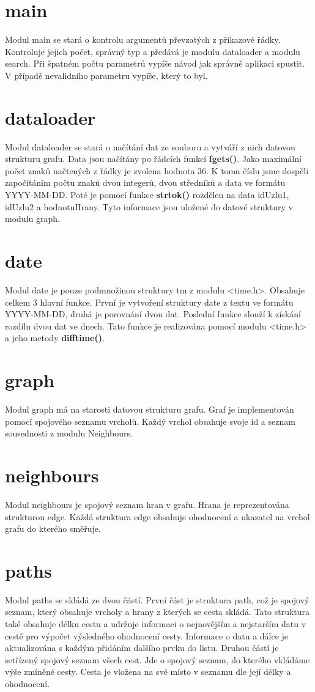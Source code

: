 \documentclass[
12pt,
a4paper,
pdftex,
czech,
titlepage
]{report}
\begin{document}
\section{main}
Modul main se stará o kontrolu argumentů převzatých z příkazové řádky. Kontroluje jejich počet, správný typ a předává je modulu dataloader a modulu search. Při špatném počtu parametrů vypíše návod jak správně aplikaci spustit. V případě nevalidního parametru vypíše, který to byl.

\section{dataloader}
Modul dataloader se stará o načítání dat ze souboru a vytváří z nich datovou strukturu grafu. Data jsou načítány po řádcích funkcí \textbf{fgets()}. Jako maximální počet znaků načtených z řádky je zvolena hodnota 36. K tomu číslu jsme dospěli započítáním počtu znaků dvou integerů, dvou středníků a data ve formátu YYYY-MM-DD. Poté je pomocí funkce \textbf{strtok()} rozdělen na data idUzlu1, idUzlu2 a hodnotuHrany. Tyto informace jsou uložené do datové struktury v modulu graph.

\section{date}
Modul date je pouze podmnožinou struktury tm z modulu <time.h>. Obsahuje celkem 3 hlavní funkce. První je vytvoření struktury date z textu ve formátu YYYY-MM-DD, druhá je porovnání dvou dat. Poslední funkce slouží k získání rozdílu dvou dat ve dnech. Tato funkce je realizována pomocí modulu <time.h> a jeho metody \textbf{difftime()}.

\section{graph}
Modul graph má na starosti datovou strukturu grafu. Graf je implementován pomocí spojového seznamu vrcholů. Každý vrchol obsahuje svoje id a seznam sousednosti z modulu Neighbours.

\section{neighbours}
Modul neighbours je spojový seznam hran v grafu. Hrana je reprezentována strukturou edge. Každá struktura edge obsahuje ohodnocení a ukazatel na vrchol grafu do kterého směřuje.

\section{paths}
Modul paths se skládá ze dvou částí. První část je struktura path, což je spojový seznam, který obsahuje vrcholy a hrany z kterých se cesta skládá. Tato struktura také obsahuje délku cestu a udržuje informaci o nejnovějším a nejstarším datu v cestě pro výpočet výsledného ohodnocení cesty. Informace o datu a dálce je aktualizována s každým přidáním dalšího prvku do listu. Druhou částí je setřízený spojový seznam všech cest. Jde o spojový seznam, do kterého vkládáme výše zmíněné cesty. Cesta je vložena na své místo v seznamu dle její délky a ohodnocení.
\end{document}
